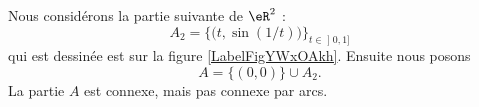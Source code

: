 \newcommand{\CaptionFigYWxOAkh}{La figure de la proposition \ref{PROPooVXDNooPZYKPr}.}


\begin{proposition}     \label{PROPooVXDNooPZYKPr}
	Nous considérons la partie suivante de \( \eR^2\) :
	\begin{equation}
		A_2=\big\{   \big( t,\sin(1/t) \big)   \big\}_{t\in \mathopen] 0 , 1 \mathclose]}
	\end{equation}
	qui est dessinée est sur la figure \ref{LabelFigYWxOAkh}. Ensuite nous posons
	\begin{equation}
		A=\big\{  (0,0)  \big\}\cup A_2.
	\end{equation}
	La partie \( A\) est connexe, mais pas connexe par arcs.
\end{proposition}

